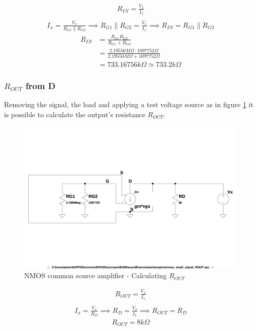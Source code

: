 \documentclass[10pt,a4paper]{book}
\begin{document}
\begin{align}
R_{IN} = \frac{V_x}{I_x}\\
\end{align}
\begin{align}
I_x = \frac{V_x}{R_{G1} \parallel R_{G2}} \implies R_{G1} \parallel R_{G2} = \frac{V_x}{I_x}
\implies R_{IN} = R_{G1} \parallel R_{G2}
\end{align}
\begin{align}
R_{IN} &= \frac{R_{G1} R_{G2}}{R_{G1} + R_{G2}}\\
&= \frac{2.19550 M\Omega \cdot 1097752\Omega}{2.19550 M\Omega + 1097752\Omega}\\
&= 733.16756k\Omega \simeq 733.2k\Omega
\end{align}

\subsubsection{$R_{OUT}$ from D}

Removing the signal, the load and applying a test voltage source as in figure \ref{nmos_pi_ROUT} it is possible to calculate the output's resistance $R_{OUT}$.\\

\begin{figure}[h]
  \centering
  \includegraphics[width=12cm]{schematics/nmos_small_signal_ROUT.jpg}
  \caption{NMOS common source amplifier - Calculating $R_{OUT}$}
  \label{nmos_pi_ROUT}
\end{figure}

\begin{align}
R_{OUT} = \frac{V_x}{I_x}\\
\end{align}
\begin{align}
I_x = \frac{V_x}{R_D} \implies R_D = \frac{V_x}{I_x} \implies R_{OUT} = R_D 
\end{align}
\begin{align}
R_{OUT} = 8k\Omega
\end{align}
\end{document}
